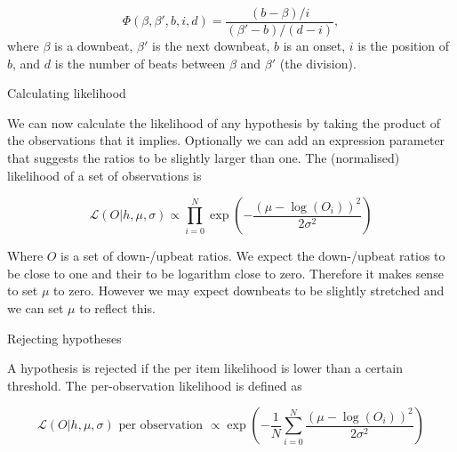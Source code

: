 \begin{equation}
\Phi(\beta, \beta', b, i, d) = \frac{(b - \beta) / i}{(\beta' - b) / (d - i)},
\end{equation}
where $\beta$ is a downbeat, $\beta'$ is the next downbeat, $b$ is an onset, $i$ is the position of $b$, and $d$ is the number of beats between $\beta$ and $\beta'$ (the division).

Calculating likelihood

We can now calculate the likelihood of any hypothesis by taking the product of the observations that it implies. Optionally we can add an expression parameter that suggests the ratios to be slightly larger than one. The (normalised) likelihood of a set of observations is

\begin{equation}
\label{eq:h_likelihood}
\mathcal{L}(O|h, \mu, \sigma) \propto \prod_{i=0}^N \exp\left(-\frac{(\mu - \log(O_i))^2}{2\sigma^2}\right)
\end{equation}

Where $O$ is a set of down-/upbeat ratios. We expect the down-/upbeat ratios to be close to one and their to be logarithm close to zero. Therefore it makes sense to set $\mu$ to zero. However we may expect downbeats to be slightly stretched and we can set $\mu$ to reflect this.

Rejecting hypotheses

A hypothesis is rejected if the per item likelihood is lower than a certain threshold. The per-observation likelihood is defined as

\begin{equation}
\label{eq:per_obs_likelihood}
\mathcal{L}(O|h, \mu, \sigma) \mbox{ per observation } \propto \exp\left(-\frac{1}{N}\sum_{i=0}^N \frac{(\mu - \log(O_i))^2}{2\sigma^2}\right)
\end{equation}







